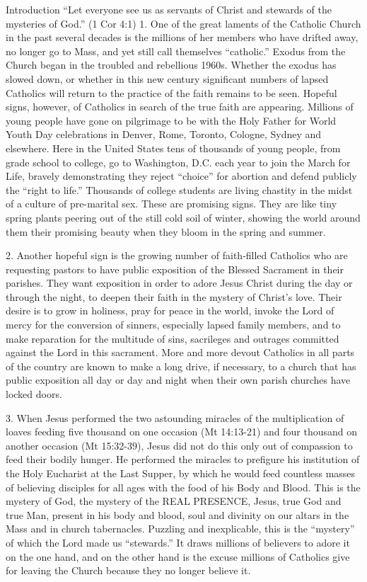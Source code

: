 \documentclass[oneside]{book}
\begin{document}
Introduction
``Let everyone see us as servants of Christ and stewards of the
  mysteries of God.'' (1 Cor 4:1)
1. One of the great laments of the Catholic Church in the past several decades
is the millions of her members who have drifted away, no longer go to Mass, and
yet still call themselves ``catholic.'' Exodus from the Church began in the
troubled and rebellious 1960s. Whether the exodus has slowed down, or whether in
this new century significant numbers of lapsed Catholics will return to the
practice of the faith remains to be seen. Hopeful signs, however, of Catholics
in search of the true faith are appearing.
Millions of young people have gone on pilgrimage to be with the Holy Father for
World Youth Day celebrations in Denver, Rome, Toronto, Cologne, Sydney and
elsewhere. Here in the United States tens of thousands of young people, from
grade school to college, go to Washington, D.C. each year to join the March for
Life, bravely demonstrating they reject ``choice'' for abortion and defend
publicly the ``right to life.'' Thousands of college students are living
chastity in the midst of a culture of pre-marital sex. These are promising
signs. They are like tiny spring plants peering out of the still cold soil of
winter, showing the world around them their promising beauty when they bloom in
the spring and summer.

2. Another hopeful sign is the growing number of faith-filled Catholics who are
requesting pastors to have public exposition of the Blessed Sacrament in their
parishes. They want exposition in order to adore Jesus Christ during the day or
through the night, to deepen their faith in the mystery of Christ's love. Their
desire is to grow in holiness, pray for peace in the world, invoke the Lord of
mercy for the conversion of sinners, especially lapsed family members, and to
make reparation for the multitude of sins, sacrileges and outrages committed
against the Lord in this sacrament. More and more devout Catholics in all parts
of the country are known to make a long drive, if necessary, to a church that
has public exposition all day or day and night when their own parish churches
have locked doors.

3. When Jesus performed the two astounding miracles of the multiplication of
loaves feeding five thousand on one occasion (Mt 14:13-21) and four thousand on
another occasion (Mt 15:32-39), Jesus did not do this only out of compassion to
feed their bodily hunger. He performed the miracles to prefigure his institution
of the Holy Eucharist at the Last Supper, by which he would feed countless
masses of believing disciples for all ages with the food of his Body and
Blood. This is the mystery of God, the mystery of the REAL PRESENCE, Jesus, true
God and true Man, present in his body and blood, soul and divinity on our altars
in the Mass and in church tabernacles. Puzzling and inexplicable, this is the
``mystery'' of which the Lord made us ``stewards.'' It draws millions of
believers to adore it on the one hand, and on the other hand is the excuse
millions of Catholics give for leaving the Church because they no longer believe
it.
\end{document}
